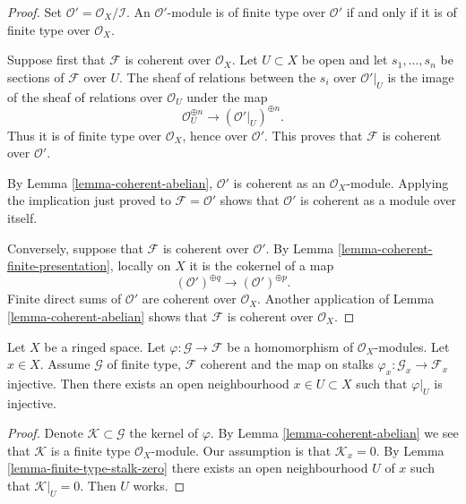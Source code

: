 \begin{proof}
Set $\mathcal{O}' = \mathcal{O}_X/\mathcal{I}$. An $\mathcal{O}'$-module
is of finite type over $\mathcal{O}'$ if and only if it is of finite type
over $\mathcal{O}_X$.

Suppose first that $\mathcal{F}$ is coherent over $\mathcal{O}_X$. Let
$U \subset X$ be open and let $s_1, \ldots, s_n$ be sections of
$\mathcal{F}$ over $U$. The sheaf of relations between the $s_i$ over
$\mathcal{O}'|_U$ is the image of the sheaf of relations over
$\mathcal{O}_U$ under the map
$$
\mathcal{O}_U^{\oplus n} \longrightarrow (\mathcal{O}'|_U)^{\oplus n}.
$$
Thus it is of finite type over $\mathcal{O}_X$, hence over
$\mathcal{O}'$. This proves that $\mathcal{F}$ is coherent over
$\mathcal{O}'$.

By Lemma \ref{lemma-coherent-abelian}, $\mathcal{O}'$ is coherent as an
$\mathcal{O}_X$-module. Applying the implication just proved to
$\mathcal{F} = \mathcal{O}'$ shows that $\mathcal{O}'$ is coherent as a
module over itself.

Conversely, suppose that $\mathcal{F}$ is coherent over $\mathcal{O}'$.
By Lemma \ref{lemma-coherent-finite-presentation}, locally on $X$ it is the
cokernel of a map
$$
(\mathcal{O}')^{\oplus q} \longrightarrow
(\mathcal{O}')^{\oplus p}.
$$
Finite direct sums of $\mathcal{O}'$ are coherent over $\mathcal{O}_X$.
Another application of Lemma \ref{lemma-coherent-abelian} shows that
$\mathcal{F}$ is coherent over $\mathcal{O}_X$.
\end{proof}

\begin{lemma}
\label{lemma-finite-type-to-coherent-injective-on-stalk}
Let $X$ be a ringed space.
Let $\varphi : \mathcal{G} \to \mathcal{F}$ be a homomorphism
of $\mathcal{O}_X$-modules.
Let $x \in X$. Assume $\mathcal{G}$ of finite type,
$\mathcal{F}$ coherent and the map on stalks
$\varphi_x : \mathcal{G}_x \to \mathcal{F}_x$ injective.
Then there exists an open neighbourhood
$x \in U \subset X$ such that $\varphi|_U$ is injective.
\end{lemma}

\begin{proof}
Denote $\mathcal{K} \subset \mathcal{G}$ the kernel of $\varphi$.
By Lemma \ref{lemma-coherent-abelian} we see that $\mathcal{K}$ is
a finite type $\mathcal{O}_X$-module. Our assumption is that
$\mathcal{K}_x = 0$. By Lemma \ref{lemma-finite-type-stalk-zero}
there exists an open neighbourhood $U$ of $x$ such that $\mathcal{K}|_U = 0$.
Then $U$ works.
\end{proof}













